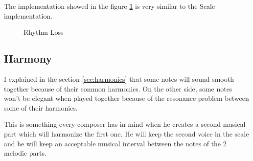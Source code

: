 \documentclass[12pt]{report}
\begin{document}
The implementation showed in the figure \ref{fig:loss_rhythm} is very similar to the Scale implementation.


\begin{figure}[h]
\begin{center}
\end{center}
\caption{Rhythm Loss}
\label{fig:loss_rhythm}
\end{figure}

\subsection{Harmony}
\label{sec:harmony}

I explained in the section \ref{sec:harmonics} that some notes will sound smooth together because of their common harmonics.
On the other side, some notes won't be elegant when played together because of the resonance problem between some of their harmonics.

This is something every composer has in mind when he creates a second musical part which will harmonize the first one.
He will keep the second voice in the scale and he will keep an acceptable musical interval between the notes of the 2 melodic parts.
\end{document}

